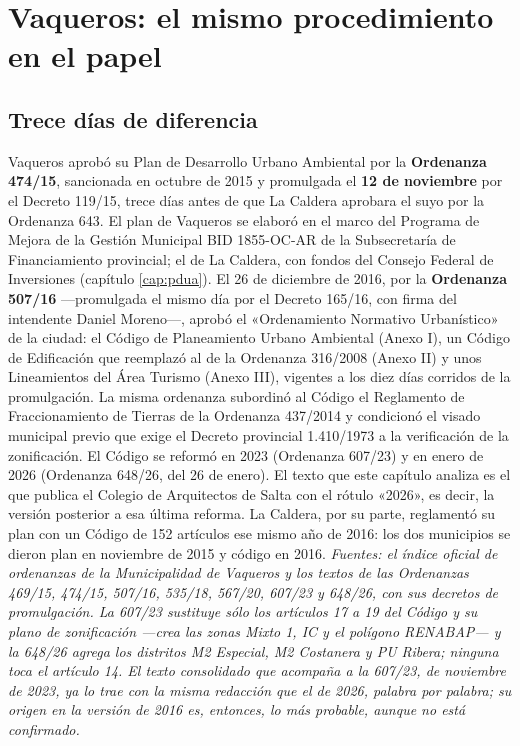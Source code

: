 \chapter{Vaqueros: el mismo procedimiento en el papel}

\label{cap:vaqueros}
\section{Trece días de diferencia}

Vaqueros aprobó su Plan de Desarrollo Urbano Ambiental por la \textbf{Ordenanza 474/15}, sancionada en octubre de 2015 y promulgada el \textbf{12 de noviembre} por el Decreto 119/15, trece días antes de que La Caldera aprobara el suyo por la Ordenanza 643. El plan de Vaqueros se elaboró en el marco del Programa de Mejora de la Gestión Municipal BID 1855-OC-AR de la Subsecretaría de Financiamiento provincial; el de La Caldera, con fondos del Consejo Federal de Inversiones (capítulo \ref{cap:pdua}). El 26 de diciembre de 2016, por la \textbf{Ordenanza 507/16} ---promulgada el mismo día por el Decreto 165/16, con firma del intendente Daniel Moreno---, aprobó el «Ordenamiento Normativo Urbanístico» de la ciudad: el Código de Planeamiento Urbano Ambiental (Anexo I), un Código de Edificación que reemplazó al de la Ordenanza 316/2008 (Anexo II) y unos Lineamientos del Área Turismo (Anexo III), vigentes a los diez días corridos de la promulgación. La misma ordenanza subordinó al Código el Reglamento de Fraccionamiento de Tierras de la Ordenanza 437/2014 y condicionó el visado municipal previo que exige el Decreto provincial 1.410/1973 a la verificación de la zonificación. El Código se reformó en 2023 (Ordenanza 607/23) y en enero de 2026 (Ordenanza 648/26, del 26 de enero). El texto que este capítulo analiza es el que publica el Colegio de Arquitectos de Salta con el rótulo «2026», es decir, la versión posterior a esa última reforma. La Caldera, por su parte, reglamentó su plan con un Código de 152 artículos ese mismo año de 2016: los dos municipios se dieron plan en noviembre de 2015 y código en 2016. \textit{Fuentes: el índice oficial de ordenanzas de la Municipalidad de Vaqueros y los textos de las Ordenanzas 469/15, 474/15, 507/16, 535/18, 567/20, 607/23 y 648/26, con sus decretos de promulgación. La 607/23 sustituye sólo los artículos 17 a 19 del Código y su plano de zonificación ---crea las zonas Mixto 1, IC y el polígono RENABAP--- y la 648/26 agrega los distritos M2 Especial, M2 Costanera y PU Ribera; ninguna toca el artículo 14. El texto consolidado que acompaña a la 607/23, de noviembre de 2023, ya lo trae con la misma redacción que el de 2026, palabra por palabra; su origen en la versión de 2016 es, entonces, lo más probable, aunque no está confirmado.} 

